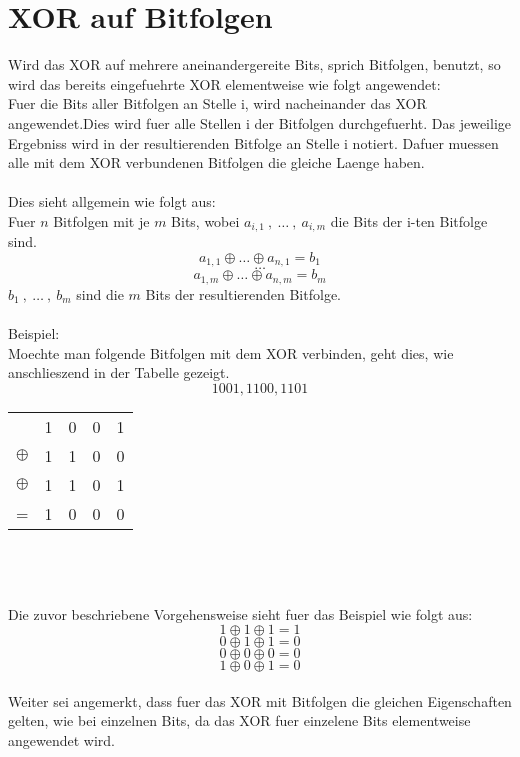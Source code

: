 \documentclass[a4paper,10pt,ngerman]{scrartcl}
\begin{document}
\section{XOR auf Bitfolgen}
Wird das XOR auf mehrere aneinandergereite Bits, sprich Bitfolgen, benutzt, so wird das bereits eingefuehrte XOR elementweise wie folgt angewendet:\\
Fuer die Bits aller Bitfolgen an Stelle i, wird nacheinander das XOR angewendet.Dies wird fuer alle Stellen i der Bitfolgen durchgefuerht. Das jeweilige Ergebniss wird in der resultierenden Bitfolge an Stelle i notiert.
Dafuer muessen alle mit dem XOR verbundenen Bitfolgen die gleiche Laenge haben.\\\\
Dies sieht allgemein wie folgt aus:\\
Fuer \(n\) Bitfolgen mit je \(m\) Bits, wobei \(a_{i, 1} \ , \ \dots \ , \ a_{i, m} \) die Bits der i-ten Bitfolge sind.
\[a_{1, 1} \oplus \dots \oplus a_{n, 1} = b_1\]
\[ \dots \]
\[a_{1, m} \oplus \dots \oplus a_{n, m} = b_m\]
\( b_1 \ , \ \dots \ , \ b_m \) sind die \(m\) Bits der resultierenden Bitfolge.
\\\\
Beispiel:\\
Moechte man folgende Bitfolgen mit dem XOR verbinden, geht dies, wie anschlieszend in der Tabelle gezeigt.
\[1001, 1100, 1101\]
\begin{tabular}[c]{ c | c | c | c | c }			
   & 1 & 0 & 0 & 1 \\
  \(\oplus\) & 1 & 1 & 0 & 0 \\
	\(\oplus\) & 1 & 1 & 0 & 1 \\
	\hline
	= & 1 & 0 & 0 & 0 \\ 
\end{tabular}   
\\\\\\Die zuvor beschriebene Vorgehensweise sieht fuer das Beispiel wie folgt aus:
\[1 \oplus 1 \oplus 1 = 1\]
\[0 \oplus 1 \oplus 1 = 0\]
\[0 \oplus 0 \oplus 0 = 0\]
\[1 \oplus 0 \oplus 1 = 0\]
\\Weiter sei angemerkt, dass fuer das XOR mit Bitfolgen die gleichen Eigenschaften gelten, wie bei einzelnen Bits, da das XOR fuer einzelene Bits elementweise angewendet wird.
\end{document}
